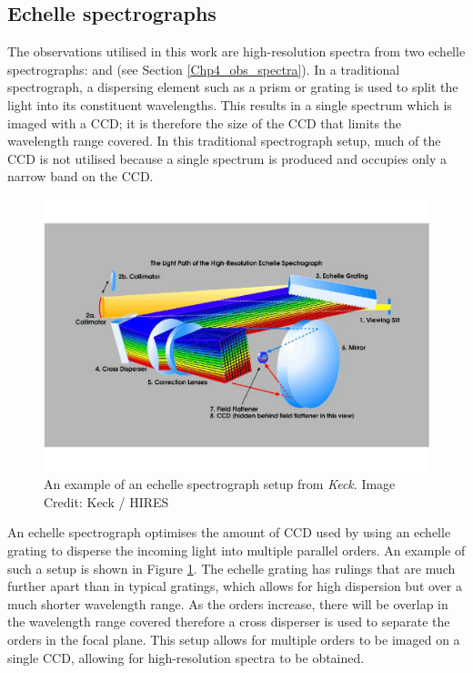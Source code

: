 \subsection{Echelle spectrographs}

The observations utilised in this work are high-resolution spectra from two echelle spectrographs: \esp and \narval (see Section \ref{Chp4_obs_spectra}). In a traditional spectrograph, a dispersing element such as a prism or grating is used to split the light into its constituent wavelengths. This results in a single spectrum which is imaged with a CCD; it is therefore the size of the CCD that limits the wavelength range covered. In this traditional spectrograph setup, much of the CCD is not utilised because a single spectrum is produced and occupies only a narrow band on the CCD.

\begin{figure}
    \centering
    \includegraphics[scale=0.55]{Figures/4-Chromospheric_age/HIRES_diagram.pdf}
    \caption[Example of echelle spectrograph]{An example of an echelle spectrograph setup from \textit{Keck}. Image Credit: Keck / HIRES}
    \label{fig:echelle_diagram}
\end{figure}

An echelle spectrograph optimises the amount of CCD used by using an echelle grating to disperse the incoming light into multiple parallel orders. An example of such a setup is shown in Figure \ref{fig:echelle_diagram}. The echelle grating has rulings that are much further apart than in typical gratings, which allows for high dispersion but over a much shorter wavelength range. As the orders increase, there will be overlap in the wavelength range covered therefore a cross disperser is used to separate the orders in the focal plane. This setup allows for multiple orders to be imaged on a single CCD, allowing for high-resolution spectra to be obtained.

